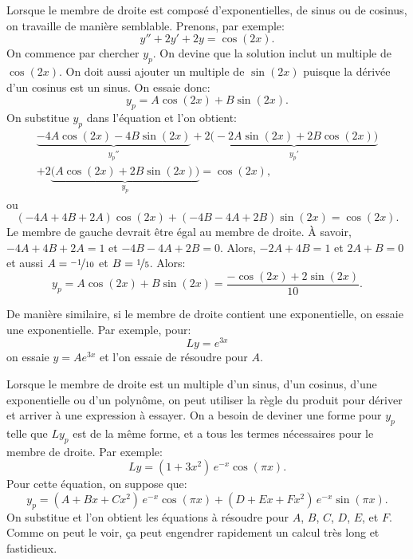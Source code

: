 \medskip

Lorsque le membre de droite est composé d'exponentielles, de sinus ou de cosinus, on travaille de manière semblable. Prenons, par exemple: 
\begin{equation*}
y''+2y'+2y = \cos (2x) .
\end{equation*}
On commence par chercher $y_p$.  On devine que la solution inclut un multiple de  $\cos(2x)$.
On doit aussi ajouter un multiple de $\sin (2x)$ puisque la dérivée d'un cosinus est un sinus. On essaie donc: 
\begin{equation*}
y_p = A \cos (2x) + B \sin (2x) .
\end{equation*}
On substitue  $y_p$ dans l'équation et l'on obtient: 
\begin{multline*}
\underbrace{-4 A \cos (2x) - 4 B \sin (2x)}_{y_p''}
+2 \underbrace{\bigl(-2A \sin (2x) + 2B \cos (2x)\bigr)}_{y_p'}
\\
+
2 \underbrace{\bigl(A \cos (2x) + 2B \sin (2x)\bigr)}_{y_p}
= \cos (2x) ,
\end{multline*}
ou
\begin{equation*}
(-4A+4B+2A) \cos(2x) +
(-4B-4A+2B) \sin(2x)
= \cos(2x) .
\end{equation*}
Le membre de gauche devrait être égal au membre de droite. À savoir,
$-4A + 4B + 2A = 1$ et
$-4B - 4A + 2B = 0$.  Alors, $-2A+4B =1$ et $2A+B=0$ et aussi  
$A=\nicefrac{-1}{10}$ et $B=\nicefrac{1}{5}$.  Alors: 
\begin{equation*}
y_p = A \cos (2x) + B \sin (2x) = \frac{-\cos (2x) + 2 \sin (2x)}{10} .
\end{equation*}

De manière similaire, si le membre de droite contient une exponentielle, on essaie une exponentielle. Par exemple, pour: 
\begin{equation*}
Ly = e^{3x}
\end{equation*}
on essaie $y = A e^{3x}$ et l'on essaie de résoudre pour $A$.

\medskip

Lorsque le membre de droite est un multiple d'un sinus, d'un cosinus, d'une exponentielle ou d'un polynôme, on peut utiliser la règle du produit pour dériver et arriver à une expression à essayer. On a besoin de deviner une forme pour $y_p$ telle que $Ly_p$ est de la même forme, et a tous les termes nécessaires pour le membre de droite. Par exemple: 
\begin{equation*}
Ly = (1+3x^2)\,e^{-x}\cos (\pi x) .
\end{equation*}
Pour cette équation, on suppose que: 
\begin{equation*}
y_p = (A + Bx + Cx^2)\,e^{-x} \cos (\pi x) + 
(D + Ex + Fx^2)\,e^{-x} \sin (\pi x) .
\end{equation*}
On substitue et l'on obtient les équations à résoudre pour 
$A$, $B$, $C$, $D$, $E$, et $F$.
Comme on peut le voir, ça peut engendrer rapidement un calcul très long et fastidieux.  

